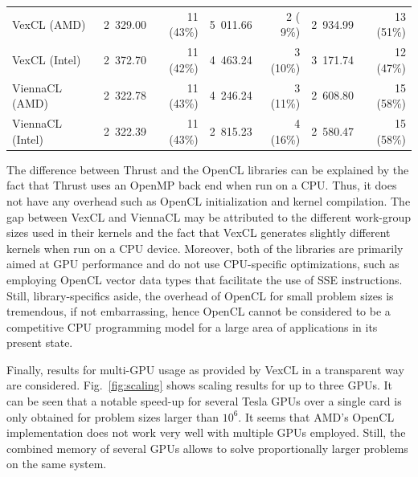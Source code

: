 \documentclass[final]{siamltex}
\newcommand{\figref}[1]{Fig.~\ref{#1}}
\begin{document}
\begin{table}
\begin{small}
\begin{tabular}{|l|rrrrrr|}
        VexCL    (AMD)   & 2~329.00 &  11 (43\%) & 5~011.66 &   2 ( 9\%) & 2~934.99 &  13 (51\%) \\
        VexCL    (Intel) & 2~372.70 &  11 (42\%) & 4~463.24 &   3 (10\%) & 3~171.74 &  12 (47\%) \\
        ViennaCL (AMD)   & 2~322.78 &  11 (43\%) & 4~246.24 &   3 (11\%) & 2~608.80 &  15 (58\%) \\
        ViennaCL (Intel) & 2~322.39 &  11 (43\%) & 2~815.23 &   4 (16\%) & 2~580.47 &  15 (58\%) \\
        \hline
    \end{tabular}
    \end{small}
\end{table}


The difference between Thrust and the OpenCL libraries can be explained by the
fact that Thrust uses an OpenMP back end when run on a CPU. Thus, it does not
have any overhead such as OpenCL initialization and kernel compilation.  The
gap between VexCL and ViennaCL may be attributed to the different work-group
sizes used in their kernels and the fact that VexCL generates slightly
different kernels when run on a CPU device. Moreover, both of the libraries are
primarily aimed at GPU performance and do not use CPU-specific optimizations,
such as employing OpenCL vector data types that facilitate the use of SSE
instructions.  Still, library-specifics aside, the overhead of OpenCL for small problem sizes is
tremendous, if not embarrassing, hence OpenCL cannot be considered to be a
competitive CPU programming model for a large area of applications in its
present state.

Finally, results for multi-GPU usage as provided by VexCL in a transparent way
are considered. \figref{fig:scaling} shows scaling results for up to three
GPUs. It can be seen that a notable speed-up for several Tesla GPUs over a
single card is only obtained for problem sizes larger than $10^6$.  It seems
that AMD's OpenCL implementation does not work very well with multiple GPUs
employed. Still, the combined memory of several GPUs allows to solve proportionally
larger problems on the same system.
\end{document}
